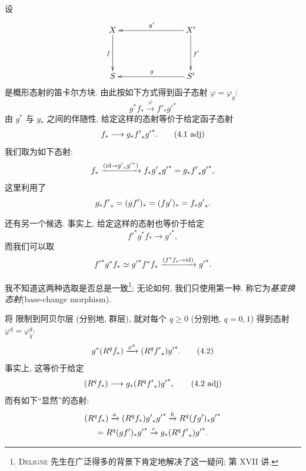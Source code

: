 设
$$
\xymatrix@C=2.75cm@R=1.5cm{
X \ar[d]_{f}&X'\ar[l]_{g'}\ar[d]^{f'}\\
S&S'\ar[l]_{g}
}
$$
是概形态射的笛卡尔方块. 由此按如下方式得到函子态射 $\varphi=\varphi_g$:
\begin{equation*}
g^{\ast}f_{\ast}\xrightarrow{\varphi}f'_{\ast}{g'}^{\ast}\tag{4.1}
\end{equation*}
由 $g^{\ast}$ 与 $g_{\ast}$ 之间的伴随性, 给定这样的态射等价于给定函子态射
\begin{equation*}
f_{\ast}\longrightarrow g_{\ast}{f'}_{\ast}{g'}^{\ast}{}.
\tag{4.1 adj}
\end{equation*}
我们取为如下态射:
$$
f_{\ast}\xrightarrow{(\operatorname{id}\rightarrow {g'}_{\ast}{g'}^{\ast})}
f_{\ast}{g'}_{\ast}{g'}^{\ast}
=g_{\ast}{f'}_{\ast}{g'}^{\ast}{},
$$
这里利用了
$$
g_{\ast}{f'}_{\ast}=(gf')_{\ast}=(fg')_{\ast}
=f_{\ast}{g'}_{\ast}{}.
$$

 还有另一个候选. 事实上, 给定这样的态射也等价于给定
$$
{f'}^{\ast}g^{\ast}f_{\ast}\longrightarrow {g'}^{\ast},
$$
而我们可以取
$$
{f'}^{\ast}g^{\ast}f_{\ast}\simeq
{g'}^{\ast}f^{\ast}f_{\ast}
\xrightarrow{(f^{\ast}f_{\ast}\rightarrow\operatorname{id})}{g'}^{\ast}{}.
$$

我不知道\pageoriginale 这两种选取是否总是一致\footnote[1]{\textsc{Deligne} 先生在广泛得多的背景下肯定地解决了这一疑问; \cf 第 XVII 讲.}; 无论如何, 我们只使用第一种. 称它为\emph{基变换态射}(base-change morphism).

将  限制到阿贝尔层 (分别地, 群层), 就对每个 $q\geq0$ (分别地, $q=0,1$) 得到态射 $\varphi^q=\varphi^q_g$:
\begin{equation*}
g^{\ast}(R^qf_{\ast})\xrightarrow{\varphi^q}
(R^q{f'}_{\ast}){g'}^{\ast}{}.
\tag{4.2}
\end{equation*}
事实上, 这等价于给定
\begin{equation*}
(R^qf_{\ast})\longrightarrow
g_{\ast}(R^q{f'}_{\ast}){g'}^{\ast}{},
\tag{4.2 adj}
\end{equation*}
而有如下“显然”的态射:
\begin{gather*}
(R^qf_{\ast})\xrightarrow{a}
(R^qf_{\ast}){g'}_{\ast}{g'}^{\ast}
\xrightarrow{b}R^q(fg')_{\ast}{g'}^{\ast}\\
=R^q(gf')_{\ast}{g'}^{\ast}
\xrightarrow{c}g_{\ast}(R^q{f'}_{\ast}){g'}^{\ast}{}.
\end{gather*}

